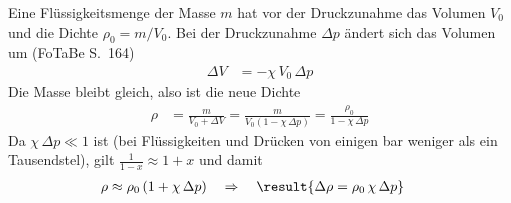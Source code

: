 Eine Flüssigkeitsmenge der Masse $m$ hat vor der Druckzunahme das Volumen $V_0$ und die Dichte $\rho_0 = m/V_0$. Bei der Druckzunahme $\Delta p$ ändert sich das Volumen um (FoTaBe S.~164)
\begin{align}
 \Delta V &= -\chi\,V_0\,\Delta p
\end{align}
Die Masse bleibt gleich, also ist die neue Dichte
\begin{align}
 \rho &= \frac{m}{V_0+\Delta V} = \frac{m}{V_0\left(1-\chi\,\Delta p\right)} = \frac{\rho_0}{1-\chi\,\Delta p}
\end{align}
Da $\chi\,\Delta p \ll 1$ ist (bei Flüssigkeiten und Drücken von einigen bar weniger als ein Tausendstel), gilt $\frac{1}{1-x}\approx 1+x$ und damit
\begin{align}
 \rho &\approx \rho_0\left(1+\chi\,\Delta p\right) \quad\Rightarrow\quad \result{\Delta\rho = \rho_0\,\chi\,\Delta p}
\end{align}
